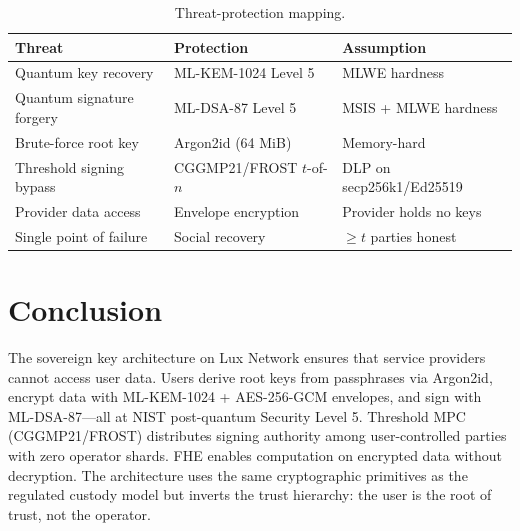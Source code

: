 \documentclass[11pt,a4paper]{article}
\begin{document}
\begin{table}[h]
\centering
\small
\begin{tabular}{@{}lll@{}}
\toprule
\textbf{Threat} & \textbf{Protection} & \textbf{Assumption} \\
\midrule
Quantum key recovery       & ML-KEM-1024 Level 5 & MLWE hardness \\
Quantum signature forgery  & ML-DSA-87 Level 5   & MSIS + MLWE hardness \\
Brute-force root key       & Argon2id (64 MiB)   & Memory-hard \\
Threshold signing bypass   & CGGMP21/FROST $t$-of-$n$ & DLP on secp256k1/Ed25519 \\
Provider data access       & Envelope encryption  & Provider holds no keys \\
Single point of failure    & Social recovery      & $\geq t$ parties honest \\
\bottomrule
\end{tabular}
\caption{Threat-protection mapping.}
\label{tab:threats}
\end{table}

\section{Conclusion}

The sovereign key architecture on Lux Network ensures that service providers
cannot access user data.  Users derive root keys from passphrases via
Argon2id, encrypt data with ML-KEM-1024 + AES-256-GCM envelopes, and
sign with ML-DSA-87---all at NIST post-quantum Security Level 5.
Threshold MPC (CGGMP21/FROST) distributes signing authority among
user-controlled parties with zero operator shards.  FHE enables
computation on encrypted data without decryption.  The architecture
uses the same cryptographic primitives as the regulated custody model
but inverts the trust hierarchy: the user is the root of trust, not
the operator.
\end{document}
